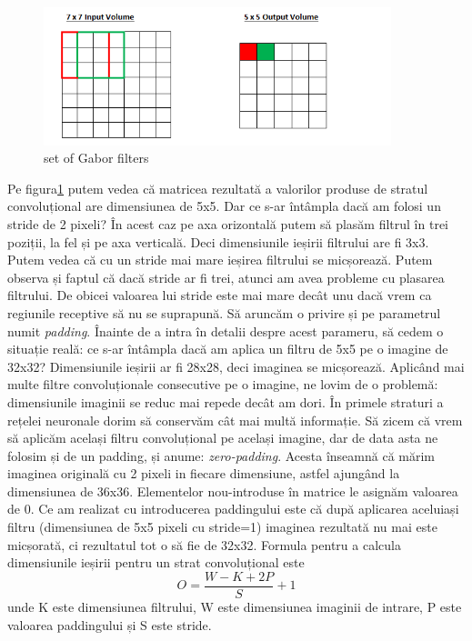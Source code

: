\begin{figure}[h!]
    	\centering
	\captionsetup{justification=centering, margin=2cm}
	\includegraphics[width=0.9\textwidth]{figures/con_lay_stride.png}
	\caption{set of Gabor filters \cite{conv_lay_params}}
	\label{fig:con_lay_str}
\end{figure}


Pe figura\ref{fig:con_lay_str} putem vedea că matricea rezultată a valorilor produse de stratul convoluțional are dimensiunea de 5x5. Dar ce s-ar întâmpla dacă am folosi un stride de 2 pixeli? În acest caz pe axa orizontală putem să plasăm filtrul în trei poziții, la fel și pe axa verticală. Deci dimensiunile ieșirii filtrului are fi 3x3.\newline
Putem vedea că cu un stride mai mare ieșirea filtrului se micșorează. Putem observa și faptul că dacă stride ar fi trei, atunci am avea probleme cu plasarea filtrului. De obicei valoarea lui stride este mai mare decât unu dacă vrem ca regiunile receptive să nu se suprapună.\newline
Să aruncăm o privire și pe parametrul numit \textit{padding}. Înainte de a intra în detalii despre acest parameru, să cedem o situație reală: ce s-ar întâmpla dacă am aplica un filtru de 5x5 pe o imagine de 32x32? Dimensiunile ieșirii ar fi 28x28, deci imaginea se micșorează. Aplicând mai multe filtre convoluționale consecutive pe o imagine, ne lovim de o problemă: dimensiunile imaginii se reduc mai repede decât am dori. În primele straturi a rețelei neuronale dorim să conservăm cât mai multă informație.\newline
Să zicem că vrem să aplicăm același filtru convoluțional pe același imagine, dar de data asta ne folosim și de un padding, și anume: \textit{zero-padding}. Acesta înseamnă că mărim imaginea originală cu 2 pixeli in fiecare dimensiune, astfel ajungând la dimensiunea de 36x36. Elementelor nou-introduse în matrice le asignăm valoarea de 0.\newline
Ce am realizat cu introducerea paddingului este că după aplicarea aceluiași filtru (dimensiunea de 5x5 pixeli cu stride=1) imaginea rezultată nu mai este micșorată, ci rezultatul tot o să fie de 32x32.\newline
Formula pentru a calcula dimensiunile ieșirii pentru un strat convoluțional este
\begin{equation}
	O = \frac{W-K+2P}{S}+1
\end{equation}
unde K este dimensiunea filtrului, W este dimensiunea imaginii de intrare, P este valoarea paddingului și S este stride.


